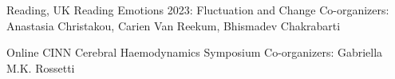 

{Reading, UK}
{Reading Emotions 2023: Fluctuation and Change}
{Co-organizers: Anastasia Christakou, Carien Van Reekum, Bhismadev Chakrabarti}
\vspace{0.5em}

{Online}
{CINN Cerebral Haemodynamics Symposium}
{Co-organizers: Gabriella M.K. Rossetti}
